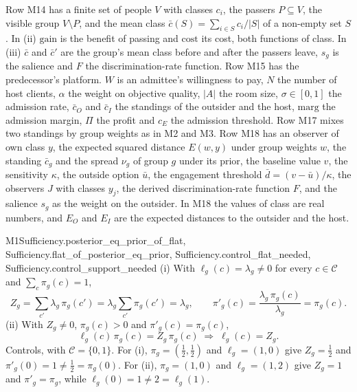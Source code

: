 Row M14 has a finite set of people $V$ with classes $c_i$, the passers
$P\subseteq V$, the visible group $V\setminus P$, and the mean class
$\bar c(S)=\sum_{i\in S}c_i/|S|$ of a non-empty set $S$. In (ii)
$\mathrm{gain}$ is the benefit of passing and $\mathrm{cost}$ its cost, both
functions of class. In (iii) $\bar c$ and $\bar c'$ are the group's mean
class before and after the passers leave, $s_g$ is the salience and $F$ the
discrimination-rate function. Row M15 has the predecessor's platform. $W$ is
an admittee's willingness to pay, $N$ the number of host clients, $\alpha$
the weight on objective quality, $|A|$ the room size, $\sigma\in[0,1]$ the
admission rate, $\bar c_O$ and $\bar c_I$ the standings of the outsider and
the host, $\mathrm{marg}$ the admission margin, $\Pi$ the profit and $c_E$
the admission threshold. Row M17 mixes two standings by group weights as in
M2 and M3. Row M18 has an observer of own class $y$, the expected squared
distance $E(w,y)$ under group weights $w$, the standing $\bar c_g$ and the
spread $\nu_g$ of group $g$ under its prior, the baseline value $v$, the
sensitivity $\kappa$, the outside option $\bar u$, the engagement threshold
$\bar d=(v-\bar u)/\kappa$, the observers $J$ with classes $y_j$, the derived
discrimination-rate function $F$, and the salience $s_g$ as the weight on
the outsider. In M18 the values of class are real numbers, and $E_O$ and
$E_I$ are the expected distances to the outsider and the host.

\begin{mproof}{M1}{Sufficiency.posterior_eq_prior_of_flat, Sufficiency.flat_of_posterior_eq_prior, Sufficiency.control_flat_needed, Sufficiency.control_support_needed}
(i) With $\ell_g(c)=\lambda_g\neq0$ for every $c\in\mathcal{C}$ and $\sum_c\pi_g(c)=1$,
\[
Z_g=\sum_{c'}\lambda_g\,\pi_g(c')=\lambda_g\sum_{c'}\pi_g(c')=\lambda_g,
\qquad
\pi'_g(c)=\frac{\lambda_g\,\pi_g(c)}{\lambda_g}=\pi_g(c).
\]
(ii) With $Z_g\neq0$, $\pi_g(c)>0$ and $\pi'_g(c)=\pi_g(c)$,
\[
\ell_g(c)\,\pi_g(c)=Z_g\,\pi_g(c)
\;\Longrightarrow\;
\ell_g(c)=Z_g .
\]
Controls, with $\mathcal{C}=\{0,1\}$. For (i), $\pi_g=(\tfrac12,\tfrac12)$ and
$\ell_g=(1,0)$ give $Z_g=\tfrac12$ and $\pi'_g(0)=1\neq\tfrac12=\pi_g(0)$. For
(ii), $\pi_g=(1,0)$ and $\ell_g=(1,2)$ give $Z_g=1$ and $\pi'_g=\pi_g$, while
$\ell_g(0)=1\neq2=\ell_g(1)$.
\end{mproof}


